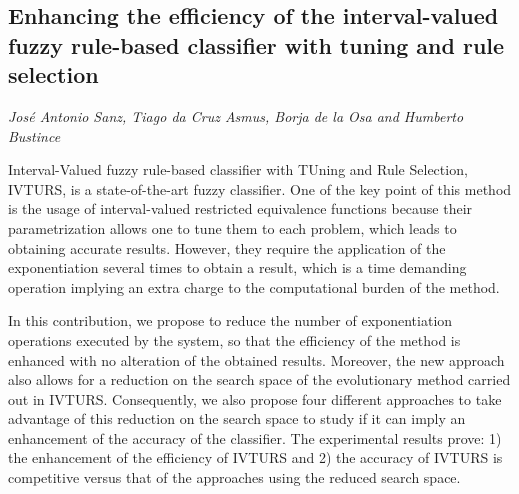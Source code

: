 \documentclass[../booklet.tex]{subfiles}
\begin{document}
\subsection[Enhancing the efficiency of the interval-valued fuzzy rule-based classifier with tuning and rule selection. {\it José Antonio Sanz, Tiago da Cruz Asmus, Borja de la Osa and Humberto Bustince}]{Enhancing the efficiency of the interval-valued fuzzy rule-based classifier with tuning and rule selection}
   

\begin{center}
  {\it José Antonio Sanz, Tiago da Cruz Asmus, Borja de la Osa and Humberto Bustince}
\end{center}




Interval-Valued fuzzy rule-based classifier with TUning and Rule Selection, IVTURS, is a state-of-the-art fuzzy classifier.  One of the key point of this method is the usage of interval-valued restricted equivalence functions because their parametrization allows one to tune them to each problem, which leads to obtaining accurate results. However, they require the application of the exponentiation several times to obtain a result, which is a time demanding operation implying an extra charge to the computational burden of the method. 

In this contribution, we propose to reduce the number of exponentiation operations executed by the system, so that the efficiency of the method is enhanced with no alteration of the obtained results. Moreover, the new approach also allows for a reduction on the search space of the evolutionary method carried out in IVTURS. Consequently, we also propose four different approaches to take advantage of this reduction on the search space to study if it can imply an enhancement of the accuracy of the classifier. The experimental results prove: 1) the enhancement of the efficiency of IVTURS and 2) the accuracy of IVTURS is competitive versus that of the approaches using the reduced search space.



\end{document}
